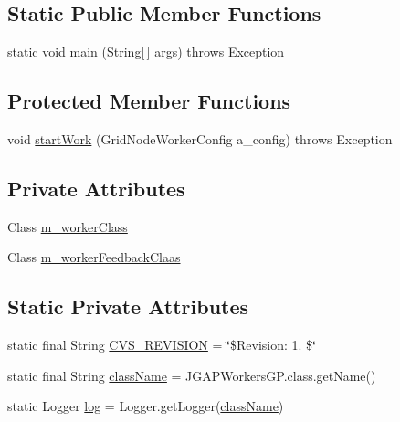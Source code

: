 \subsection*{Static Public Member Functions}
\begin{DoxyCompactItemize}
\item 
static void \hyperlink{classorg_1_1jgap_1_1distr_1_1grid_1_1gp_1_1_j_g_a_p_workers_g_p_aa86bbf49944f323b166bf23459a639a4}{main} (String\mbox{[}$\,$\mbox{]} args)  throws Exception 
\end{DoxyCompactItemize}
\subsection*{Protected Member Functions}
\begin{DoxyCompactItemize}
\item 
void \hyperlink{classorg_1_1jgap_1_1distr_1_1grid_1_1gp_1_1_j_g_a_p_workers_g_p_ab44d13975088129ed697c103797cb71d}{start\-Work} (Grid\-Node\-Worker\-Config a\-\_\-config)  throws Exception 
\end{DoxyCompactItemize}
\subsection*{Private Attributes}
\begin{DoxyCompactItemize}
\item 
Class \hyperlink{classorg_1_1jgap_1_1distr_1_1grid_1_1gp_1_1_j_g_a_p_workers_g_p_a2db75c0d75507fff7a6be6b423553a2c}{m\-\_\-worker\-Class}
\item 
Class \hyperlink{classorg_1_1jgap_1_1distr_1_1grid_1_1gp_1_1_j_g_a_p_workers_g_p_a39b9adb924bdae07c1329ecbf99f8b11}{m\-\_\-worker\-Feedback\-Claas}
\end{DoxyCompactItemize}
\subsection*{Static Private Attributes}
\begin{DoxyCompactItemize}
\item 
static final String \hyperlink{classorg_1_1jgap_1_1distr_1_1grid_1_1gp_1_1_j_g_a_p_workers_g_p_a1c442ed67b0728a29dd84c1205ab2486}{C\-V\-S\-\_\-\-R\-E\-V\-I\-S\-I\-O\-N} = \char`\"{}\$Revision\-: 1. \$\char`\"{}
\item 
static final String \hyperlink{classorg_1_1jgap_1_1distr_1_1grid_1_1gp_1_1_j_g_a_p_workers_g_p_a0b24b4c9ff9c7b9b4c87e965b9c81a77}{class\-Name} = J\-G\-A\-P\-Workers\-G\-P.\-class.\-get\-Name()
\item 
static Logger \hyperlink{classorg_1_1jgap_1_1distr_1_1grid_1_1gp_1_1_j_g_a_p_workers_g_p_ab230962a94b365c0d57fed83a941fc8c}{log} = Logger.\-get\-Logger(\hyperlink{classorg_1_1jgap_1_1distr_1_1grid_1_1gp_1_1_j_g_a_p_workers_g_p_a0b24b4c9ff9c7b9b4c87e965b9c81a77}{class\-Name})
\end{DoxyCompactItemize}


